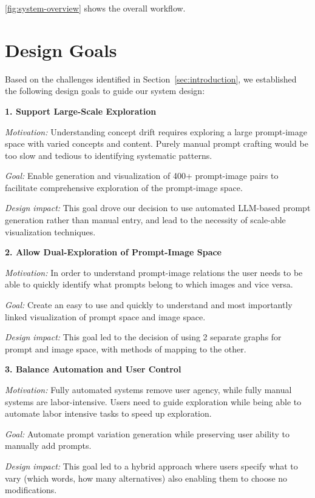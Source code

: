 \documentclass[
  a4paper,  %
  twoside,  %
  bibliography=totoc,
  headsepline,
  cleardoublepage=empty,
  parskip=half,
  draft=false
]{scrbook}
\begin{document}
\ref{fig:system-overview} shows the overall workflow.

\section{Design Goals}

Based on the challenges identified in Section~\ref{sec:introduction}, we established the following design goals to guide our system design:

\textbf{1. Support Large-Scale Exploration}

\textit{Motivation:} Understanding concept drift requires exploring a large prompt-image space with varied concepts and content. Purely manual prompt crafting would be too slow and tedious to identifying systematic patterns.

\textit{Goal:} Enable generation and visualization of 400+ prompt-image pairs to facilitate comprehensive exploration of the prompt-image space.

\textit{Design impact:} This goal drove our decision to use automated LLM-based prompt generation rather than manual entry, and lead to the necessity of scale-able visualization techniques.

\textbf{2. Allow Dual-Exploration of Prompt-Image Space}

\textit{Motivation:} In order to understand prompt-image relations the user needs to be able to quickly identify what prompts belong to which images and vice versa.

\textit{Goal:} Create an easy to use and quickly to understand and most importantly linked visualization of prompt space and image space.

\textit{Design impact:} This goal led to the decision of using 2 separate graphs for prompt and image space, with methods of mapping to the other. 


\textbf{3. Balance Automation and User Control}

\textit{Motivation:} Fully automated systems remove user agency, while fully manual systems are labor-intensive. Users need to guide exploration while being able to automate labor intensive tasks to speed up exploration.

\textit{Goal:} Automate prompt variation generation while preserving user ability to manually add prompts.

\textit{Design impact:} This goal led to a hybrid approach where users specify what to vary (which words, how many alternatives) also enabling them to choose no modifications.
\end{document}
